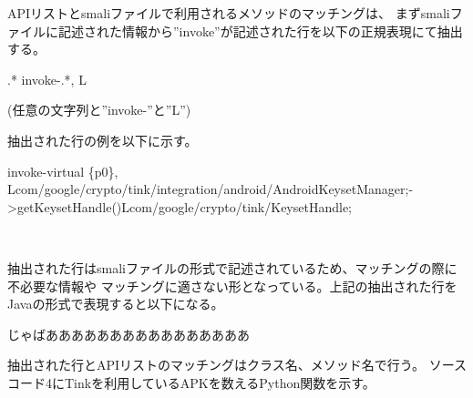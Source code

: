 APIリストとsmaliファイルで利用されるメソッドのマッチングは、
まずsmaliファイルに記述された情報から”invoke”が記述された行を以下の正規表現にて抽出する。

\begin{center} .* invoke-.*, L \end{center}
(任意の文字列と''invoke-''と''L'')

抽出された行の例を以下に示す。

\begin{center} invoke-virtual \{p0\}, Lcom/google/crypto/tink/integration/android/AndroidKeysetManager;-\textgreater getKeysetHandle()Lcom/google/crypto/tink/KeysetHandle;\end{center}　

抽出された行はsmaliファイルの形式で記述されているため、マッチングの際に不必要な情報や
マッチングに適さない形となっている。上記の抽出された行をJavaの形式で表現すると以下になる。

\begin{center}じゃばああああああああああああああああ\end{center}
\fi
抽出された行とAPIリストのマッチングはクラス名、メソッド名で行う。
ソースコード4にTinkを利用しているAPKを数えるPython関数を示す。%



































